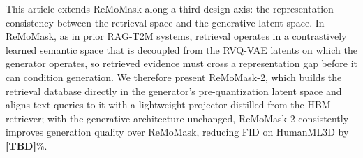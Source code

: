 

This article extends ReMoMask along a third design axis: the representation consistency between the retrieval space and the generative latent space. In ReMoMask, as in prior RAG-T2M systems, retrieval operates in a contrastively learned semantic space that is decoupled from the RVQ-VAE latents on which the generator operates, so retrieved evidence must cross a representation gap before it can condition generation. We therefore present ReMoMask-2, which builds the retrieval database directly in the generator's pre-quantization latent space and aligns text queries to it with a lightweight projector distilled from the HBM retriever; with the generative architecture unchanged, ReMoMask-2 consistently improves generation quality over ReMoMask, reducing FID on HumanML3D by \textbf{[TBD]}\%.


